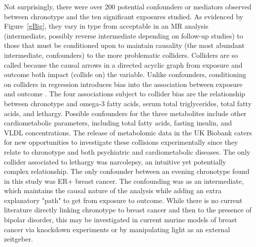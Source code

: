 \documentclass[journal,article,submit,moreauthors,pdftex]{Definitions/mdpi}
\begin{document}
Not surprisingly, there were over 200 potential confounders or mediators observed between chronotype and the ten significant exposures studied. As evidenced by Figure~\ref{gBig}, they vary in type from acceptable in an MR analysis (intermediate, possibly reverse intermediate depending on follow-up studies) to those that must be conditioned upon to maintain causality (the most abundant intermediate, confounders) to the more problematic colliders. Colliders are so called because the causal arrows in a directed acyclic graph from exposure and outcome both impact (collide on) the variable. Unlike confounders, conditioning on colliders in regression introduces bias into the association between exposure and outcome \cite{rohrer_thinking_2018}. The four associations subject to collider bias are the relationship between chronotype and omega-3 fatty acids, serum total triglycerides, total fatty acids, and lethargy. Possible confounders for the three metabolites include other cardiometabolic parameters, including total fatty acids, fasting insulin, and VLDL concentrations. The release of metabolomic data in the UK Biobank \cite{allen_uk_2014} caters for new opportunities to investigate these collisions experimentally since they relate to chronotype and both psychiatric and cardiometabolic diseases. The only collider associated to lethargy was narcolepsy, an intuitive yet potentially complex relationship. The only confounder between an evening chronotype found in this study was ER+ breast cancer. The confounding was as an intermediate, which maintains the causal nature of the analysis while adding an extra explanatory "path" to get from exposure to outcome. While there is no current literature directly linking chronotype to breast cancer and then to the presence of bipolar disorder, this may be investigated in current murine models of breast cancer via knockdown experiments or by manipulating light as an external zeitgeber.
\end{document}
